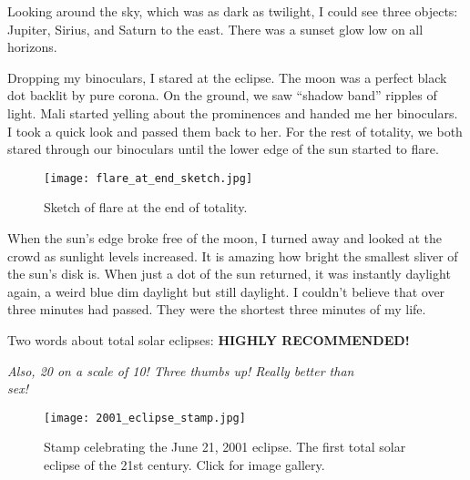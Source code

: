 Looking around the sky, which was as dark as twilight, I could see three
objects: Jupiter, Sirius, and Saturn to the east. There was a sunset
glow low on all horizons.

Dropping my binoculars, I stared at the eclipse. The moon was a perfect
black dot backlit by pure corona. On the ground, we saw ``shadow band''
ripples of light. Mali started yelling about the prominences and handed
me her binoculars. I took a quick look and passed them back to her. For
the rest of totality, we both stared through our binoculars until the
lower edge of the sun started to flare.


\begin{SCfigure}
\centering
\texttt{[image: flare\_at\_end\_sketch.jpg]}
\caption{Sketch of flare at the end of totality.}
\label{fig:8074X4}
\end{SCfigure}

When the sun's edge broke free of the moon, I turned away and looked at
the crowd as sunlight levels increased. It is amazing how bright the
smallest sliver of the sun's disk is. When just a dot of the sun
returned, it was instantly daylight again, a weird blue dim daylight but
still daylight. I couldn't believe that over three minutes had passed.
They were the shortest three minutes of my life.

Two words about total solar eclipses: \textbf{HIGHLY RECOMMENDED!}

\emph{Also, 20 on a scale of 10! Three thumbs up! Really better than\\
sex!}


\begin{SCfigure}[1][!h]
\centering
\texttt{[image: 2001\_eclipse\_stamp.jpg]}
\caption{Stamp celebrating the June 21, 2001 eclipse. The first total
solar eclipse of the 21st century. Click for image gallery.}
\label{fig:8074X5}
\end{SCfigure}


